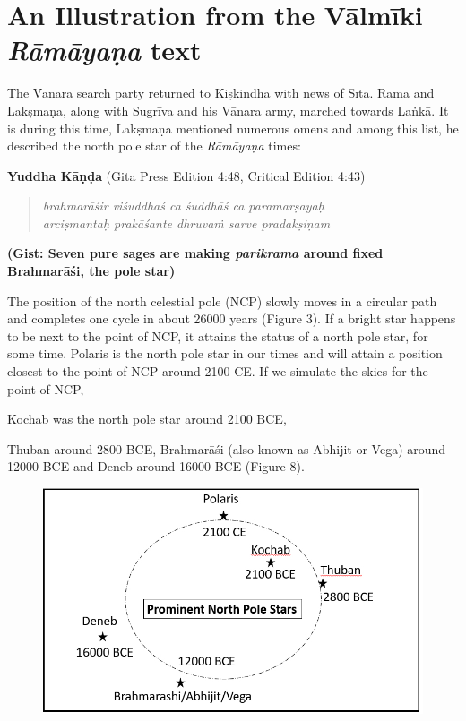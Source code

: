 \vspace{-.3cm}

\section*{An Illustration from \hfill\break the Vālmīki \textit{Rāmāyaṇa} text }

The Vānara search party returned to Kiṣkindhā with news of Sītā. Rāma and Lakṣmaṇa, along with Sugrīva and his Vānara army, marched towards Laṅkā. It is during this time, Lakṣmaṇa mentioned numerous omens and among this list, he described the north pole star of the \textit{Rāmāyaṇa} times:

\newpage

\textbf{Yuddha Kāṇḍa} (Gita Press Edition 4:48, Critical Edition 4:43)

\begin{verse}
\textit{brahmarāśir viśuddhaś ca śuddhāś ca paramarṣayaḥ }\\\textit{arciṣmantaḥ prakāśante dhruvaṁ sarve pradakṣiṇam }
\end{verse}

\textbf{(Gist: Seven pure sages are making \textit{parikrama} around fixed Brahmarāśi, the pole star)}

The position of the north celestial pole (NCP) slowly moves in a circular path and completes one cycle in about 26000 years (Figure 3). If a bright star happens to be next to the point of NCP, it attains the status of a north pole star, for some time. Polaris is the north pole star in our times and will attain a position closest to the point of NCP around 2100 CE. If we simulate the skies for the point of NCP,

Kochab was the north pole star around 2100 BCE,

Thuban around 2800 BCE, Brahmarāśi (also known as Abhijit or Vega) around 12000 BCE and Deneb around 16000 BCE (Figure 8).

\begin{figure}[!h]
\includegraphics[scale=.32]{images/chap2-10.jpg}\\[0.1cm]
\end{figure}

